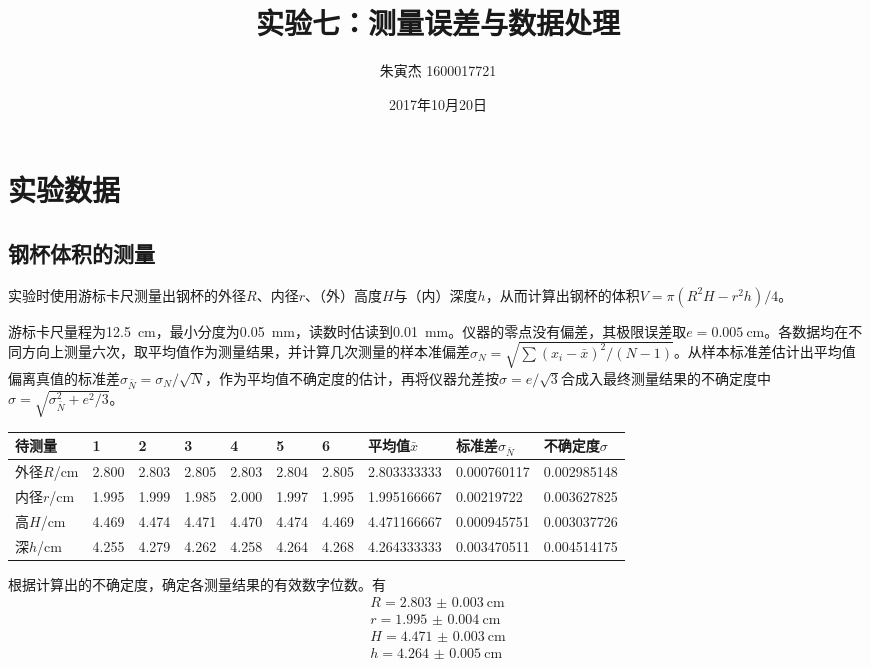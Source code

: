 \documentclass[UTF8]{ctexart}
\title{实验七：测量误差与数据处理}
\author{朱寅杰 1600017721}
\date{2017年10月20日}
\begin{document}
\maketitle

\section{实验数据}

\subsection{钢杯体积的测量}

实验时使用游标卡尺测量出钢杯的外径$R$、内径$r$、（外）高度$H$与（内）深度$h$，从而计算出钢杯的体积$V=\pi(R^2H-r^2h)/4$。

游标卡尺量程为\SI{12.5}{\cm}，最小分度为\SI{0.05}{\mm}，读数时估读到\SI{0.01}{\mm}。仪器的零点没有偏差，其极限误差取$e=\SI{0.005}{\cm}$。各数据均在不同方向上测量六次，取平均值作为测量结果，并计算几次测量的样本准偏差$\sigma_N=\sqrt{\sum (x_i-\bar{x})^2/(N-1)}$。从样本标准差估计出平均值偏离真值的标准差$\sigma_{\bar{N}}=\sigma_N/\sqrt{N}$，作为平均值不确定度的估计，再将仪器允差按$\sigma=e/\sqrt{3}$合成入最终测量结果的不确定度中$\sigma=\sqrt{\sigma_{\bar{N}}^2+e^2/3}$。

\noindent
\begin{tabu} to \linewidth {X[2]|X X X X X X|X[2] X[2]|X[2]}
\hline
待测量& 1&  2&  3&  4&  5&  6&  平均值$\bar{x}$\footnotemark[1]&标准差$\sigma_{\bar{N}}$&不确定度$\sigma$ \\
\hline
外径$R$/cm&	2.800&	2.803&	2.805&	2.803&	2.804&	2.805&	2.803333333&	0.000760117&	0.002985148
\\
内径$r$/cm&	1.995&	1.999&	1.985&	2.000&	1.997&	1.995&	1.995166667&	0.00219722&	0.003627825
\\
高$H$/cm&	4.469&	4.474&	4.471&	4.470&	4.474&	4.469&	4.471166667&	0.000945751&	0.003037726
\\
深$h$/cm&	4.255&	4.279&	4.262&	4.258&	4.264&	4.268&	4.264333333&	0.003470511&	0.004514175
\\
\hline
\end{tabu}


根据计算出的不确定度，确定各测量结果的有效数字位数。有
\begin{gather}
   R=\SI{2.803(3)}{\cm} \\
   r=\SI{1.995(4)}{\cm} \\
   H=\SI{4.471(3)}{\cm} \\
   h=\SI{4.264(5)}{\cm}
\end{gather}
\end{document}
